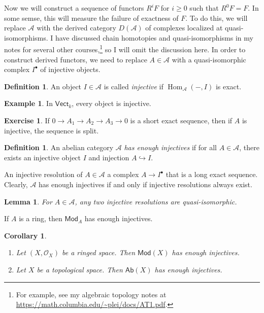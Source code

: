 \documentclass[leqno, openany]{memoir}
\newtheorem{cor}[thm]{Corollary}
\newtheorem{lem}[thm]{Lemma}
\theoremstyle{definition}
\newtheorem{defn}[thm]{Definition}
\newtheorem{exm}[thm]{Example}
\newtheorem{exer}[thm]{Exercise}
\theoremstyle{remark}
\theoremstyle{plain}
\theoremstyle{definition}
\theoremstyle{remark}
\newcommand{\mc}[1]{\mathcal{#1}}
\newcommand{\ms}[1]{\mathsf{#1}}
\DeclareMathOperator{\Hom}{Hom}
\begin{document}
Now we will construct a sequence of functors $R^i F$ for $i \geq 0$ such that $R^0 F = F$. In some semse, this will measure the failure of exactness of $F$. To do this, we will replace $\mc{A}$ with the derived category $D(\mc{A})$ of complexes localized at quasi-isomorphisms. I have discussed chain homotopies and quasi-isomorphisms in my notes for several other courses,\footnote{For example, see my algebraic topology notes at \url{https://math.columbia.edu/~plei/docs/AT1.pdf}.} so I will omit the discussion here. In order to construct derived functors, we need to replace $A \in \mc{A}$ with a quasi-isomorphic complex $I^{\bullet}$ of injective objects.

\begin{defn}
    An object $I \in \mc{A}$ is called \textit{injective} if $\Hom_{\mc{A}}(-, I)$ is exact.
\end{defn}

\begin{exm}
    In $\ms{Vect}_k$, every object is injective.
\end{exm}

\begin{exer}
    If $0 \to A_1 \to A_2 \to A_3 \to 0$ is a short exact sequence, then if $A$ is injective, the sequence is split.
\end{exer}

\begin{defn}
    An abelian category $\mc{A}$ \textit{has enough injectives} if for all $A \in \mc{A}$, there exists an injective object $I$ and injection $A \hookrightarrow I$.
\end{defn}

An injective resolution of $A \in \mc{A}$ a complex $A \to I^{\bullet}$ that is a long exact sequence. Clearly, $\mc{A}$ has enough injectives if and only if injective resolutions always exist.

\begin{lem}
    For $A \in \mc{A}$, any two injective resolutions are quasi-isomorphic.
\end{lem}

If $A$ is a ring, then $\ms{Mod}_A$ has enough injectives.

\begin{cor}\leavevmode
    \begin{enumerate}
        \item Let $(X, \mc{O}_X)$ be a ringed space. Then $\ms{Mod}(X)$ has enough injectives.
        \item Let $X$ be a topological space. Then $\ms{Ab}(X)$ has enough injectives.
    \end{enumerate}
\end{cor}
\end{document}
